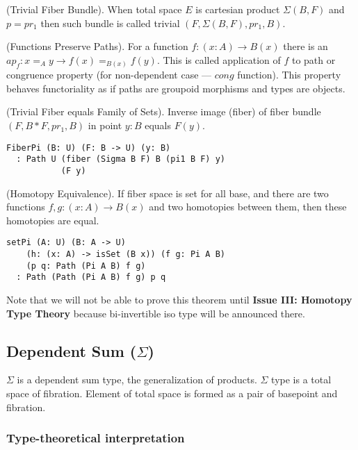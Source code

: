 \documentclass{article}
\begin{document}
\begin{definition} (Trivial Fiber Bundle).
When total space $E$ is cartesian product $\Sigma(B,F)$ and $p = pr_1$
then such bundle is called trivial $(F,\Sigma(B,F),pr_1,B)$.
\end{definition}

\begin{theorem} (Functions Preserve Paths).
For a function $f: (x:A) \rightarrow B(x)$
there is an $ap_f : x =_A y \rightarrow f(x) =_{B(x)} f(y)$. This is called
application of $f$ to path or congruence property (for non-dependent case ---
$cong$ function). This property behaves functoriality
as if paths are groupoid morphisms and types are objects.
\end{theorem}

\begin{theorem} (Trivial Fiber equals Family of Sets).
Inverse image (fiber) of fiber bundle $(F,B*F,pr_1,B)$ in point $y:B$ equals $F(y)$.
\begin{lstlisting}
FiberPi (B: U) (F: B -> U) (y: B)
  : Path U (fiber (Sigma B F) B (pi1 B F) y)
           (F y)
\end{lstlisting}
\end{theorem}

\begin{theorem} (Homotopy Equivalence).
If fiber space is set for all base, and
there are two functions $f,g : (x:A) \rightarrow B(x)$ and two
homotopies between them, then these homotopies are equal.
\begin{lstlisting}
setPi (A: U) (B: A -> U)
    (h: (x: A) -> isSet (B x)) (f g: Pi A B)
    (p q: Path (Pi A B) f g)
  : Path (Path (Pi A B) f g) p q
\end{lstlisting}
\end{theorem}

Note that we will not be able to prove this theorem
until {\bf Issue III: Homotopy Type Theory} because
bi-invertible iso type will be announced there.

\subsection{Dependent Sum ($\Sigma$)}

$\Sigma$ is a dependent sum type, the generalization of products.
$\Sigma$ type is a total space of fibration. Element of total
space is formed as a pair of basepoint and fibration.

\subsubsection*{Type-theoretical interpretation}
\end{document}
